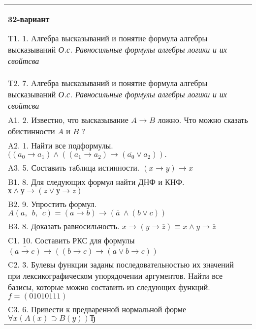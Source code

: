 \documentclass{article}
\begin{document}
\begin{tabular}{m{17cm}}
\textbf{32-вариант}
\newline

T1. 1. Алгебра высказываний и понятие формула алгебры высказываний \emph{О.с. Равносильные формулы алгебры логики и их свойтсва} \\
T2. 7. Алгебра высказываний и понятие формула алгебры высказываний \emph{О.с. Равносильные формулы алгебры логики и их свойтсва} \\
A1. 2. Известно, что высказывание \(A \rightarrow B\) ложно. Что можно сказать обистинности \(A\) и \(B\) ? \\
A2. 1. Найти все подформулы. \(((a_{0} \rightarrow a_{1}) \land ((a_{1} \rightarrow a_{2}) \rightarrow (\overline{a_{0}} \vee a_{2})).\) \\
A3. 5. Составить таблица истинности. \((x \rightarrow \overline{y}) \rightarrow \overline{x}\) \\
B1. 8. Для следующих формул найти ДНФ и КНФ. \(х \land у \rightarrow (z \vee у \rightarrow z)\) \\
B2. 9. Упростить формул. \(A(a,\ \ b,\ \ c) = (a \rightarrow b) \rightarrow (\overline{a}\  \land (b \vee c))\) \\
B3. 8. Доказать равносильность. \(x \rightarrow \left( y \rightarrow \overline{z} \right) \equiv x \land y \rightarrow \overline{z}\) \\
C1. 10. Составить РКС для формулы \(\overline{(a \rightarrow c)} \rightarrow \left( (b \rightarrow c) \rightarrow (a \vee b \rightarrow c) \right)\) \\
C2. 3. Булевы функции заданы последовательностью их значений при лексикографическом упорядочении аргументов. Найти все базисы, которые можно составить из следующих функций. \(f = (01010111)\) \\
C3. 6. Привести к предваренной нормальной форме \(\forall x(A(x) \supset B(y))Ђ\) \\

\end{tabular}
\vspace{1cm}
\end{document}
